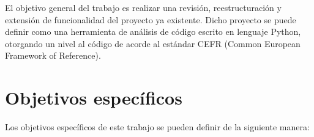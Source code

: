 \documentclass[a4paper, 12pt]{book}
\begin{document}


El objetivo general del trabajo es realizar una revisión, reestructuración y extensión de funcionalidad del proyecto ya existente. Dicho proyecto se puede definir como una herramienta de análisis de código escrito en lenguaje Python, otorgando un nivel al código de acorde al estándar CEFR (Common European Framework of Reference).

\section{Objetivos específicos}
\label{sec:objetivos-especificos}


Los objetivos específicos de este trabajo se pueden definir de la siguiente manera:
\end{document}
